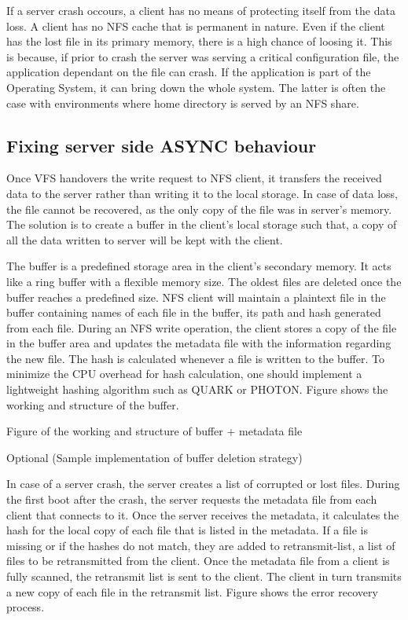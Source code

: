 \documentclass[conference]{IEEEtran}
\begin{document}
If a server crash occours, a client has no means of protecting itself from
the data loss. A client has no NFS cache that is permanent in nature. Even
if the client has the lost file in its primary memory, there is a high
chance of loosing it. This is because, if prior to crash the server was
serving a critical configuration file, the application dependant on the file
can crash. If the application is part of the Operating System, it can bring
down the whole system. The latter is often the case with environments where
home directory is served by an NFS share.

\subsection{Fixing server side ASYNC behaviour}

Once VFS handovers the write request to NFS client, it transfers the 
received data to the server rather than writing it to the local storage. In
case of data loss, the file cannot be recovered, as the only copy of the
file was in server's memory. The solution is to create a buffer in the 
client's local storage such that, a copy of all the data written to server 
will be kept with the client.

The buffer is a predefined storage area in the client's secondary memory.
It acts like a ring buffer with a flexible memory size. The oldest files are
deleted once the buffer reaches a predefined size. NFS client will maintain
a plaintext file in the buffer containing names of each file in the buffer,
its path and hash generated from each file. During an NFS write operation,
the client stores a copy of the file in the buffer area and updates the 
metadata file with the information regarding the  new file. The hash is
calculated whenever a file is written to the buffer. To minimize the CPU
overhead for hash calculation, one should implement a lightweight hashing
algorithm such as QUARK or PHOTON. Figure shows the working and structure of
the buffer.

Figure of the working and structure of buffer + metadata file

Optional (Sample implementation of buffer deletion strategy)

In case of a server crash, the server creates a list of corrupted or lost
files. During the first boot after the crash, the server requests the
metadata file from each client that connects to it. Once the server receives
the metadata, it calculates the hash for the local copy of each file that
is listed in the metadata. If a file is missing or if the hashes do not
match, they are added to retransmit-list, a list of files to be 
retransmitted from the client. Once the metadata file from a client is fully
scanned, the retransmit list is sent to the client. The client in turn
transmits a new copy of each file in the retransmit list. Figure shows the
error recovery process.
\end{document}
